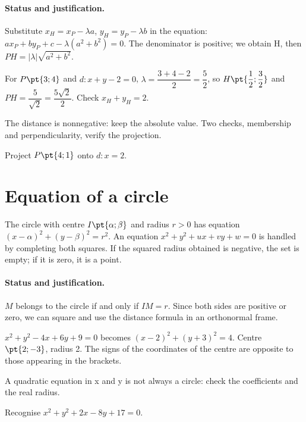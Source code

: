 \paragraph{Status and justification.} Substitute $x_H=x_P-\lambda a$, $y_H=y_P-\lambda b$ in the equation: $ax_P+by_P+c-\lambda(a^2+b^2)=0$. The denominator is positive; we obtain H, then $PH=|\lambda|\sqrt{a^2+b^2}$.
\begin{example}For $P\pt{3;4}$ and $d:x+y-2=0$, $\lambda =\dfrac{3+4-2}{2}=\dfrac{5}{2}$, so $H\pt{\dfrac{1}{2};\dfrac{3}{2}}$ and $PH=\dfrac{5}{\sqrt 2}=\dfrac{5\sqrt 2}{2}$. Check $x_H+y_H=2$.\end{example}\label{C07-EX2}
\begin{pitfall}The distance is nonnegative: keep the absolute value. Two checks, membership and perpendicularity, verify the projection.\end{pitfall}
\begin{application}Project $P\pt{4;1}$ onto $d:x=2$.\end{application}\label{C07-AP2}
\section{Equation of a circle}\label{C07-U3}
\begin{keypoint}
The circle with centre $I\pt{\alpha;\beta}$ and radius $r>0$ has equation $(x-\alpha)^2+(y-\beta)^2=r^2$. An equation $x^2+y^2+ux+vy+w=0$ is handled by completing both squares. If the squared radius obtained is negative, the set is empty; if it is zero, it is a point.
\end{keypoint}
\paragraph{Status and justification.} $M$ belongs to the circle if and only if $IM=r$. Since both sides are positive or zero, we can square and use the distance formula in an orthonormal frame.
\begin{example}$x^2+y^2-4x+6y+9=0$ becomes $(x-2)^2+(y+3)^2=4$. Centre $\pt{2;-3}$, radius 2. The signs of the coordinates of the centre are opposite to those appearing in the brackets.\end{example}\label{C07-EX3}
\begin{pitfall}A quadratic equation in x and y is not always a circle: check the coefficients and the real radius.\end{pitfall}
\begin{application}Recognise $x^2+y^2+2x-8y+17=0$.\end{application}\label{C07-AP3}
